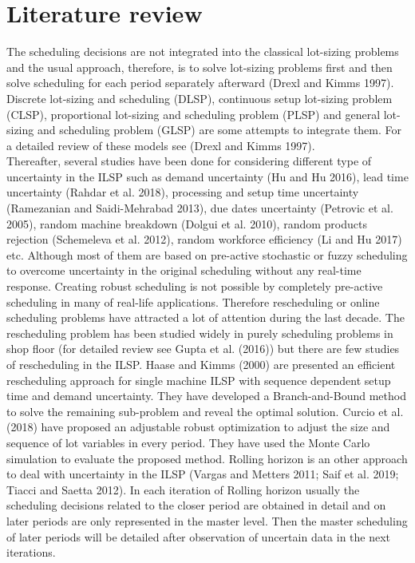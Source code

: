 \documentclass[letterpaper]{article} %
\begin{document}
\section{Literature review}
The scheduling decisions are not integrated into the classical lot-sizing problems and the usual approach, therefore, is to solve lot-sizing problems first and then solve scheduling for each period separately afterward (Drexl and Kimms 1997). Discrete lot-sizing and scheduling (DLSP), continuous setup lot-sizing problem (CLSP), proportional lot-sizing and scheduling problem (PLSP) and general lot-sizing and scheduling problem (GLSP) are some attempts to integrate them. For a detailed review of these models see (Drexl and Kimms 1997).\\
Thereafter, several studies have been done for considering different type of uncertainty in the ILSP such as demand uncertainty (Hu and Hu 2016), lead time uncertainty (Rahdar et al. 2018), processing and setup time uncertainty (Ramezanian and Saidi-Mehrabad 2013), due dates uncertainty (Petrovic et al. 2005), random machine breakdown (Dolgui et al. 2010), random products rejection (Schemeleva et al. 2012), random workforce efficiency (Li and Hu 2017) etc. Although most of them are based on pre-active stochastic or fuzzy scheduling to overcome uncertainty in the original scheduling without any real-time response. Creating robust scheduling  is not possible by completely pre-active scheduling in many of real-life applications. Therefore rescheduling or online scheduling problems have attracted a lot of attention during the last decade. The rescheduling problem has been studied widely in purely scheduling problems in shop floor (for detailed review see Gupta et al. (2016)) but there are few studies of rescheduling in the ILSP. Haase and Kimms (2000) are presented an efficient rescheduling approach for single machine ILSP with sequence dependent setup time and demand uncertainty. They have developed a Branch-and-Bound method to solve the remaining sub-problem and reveal the optimal solution. Curcio et al. (2018) have proposed an adjustable robust optimization to adjust the size and sequence of lot variables in every period. They have used the Monte Carlo simulation to evaluate the proposed method. Rolling horizon is an other approach to deal with uncertainty in the ILSP (Vargas and Metters 2011; Saif et al. 2019; Tiacci and Saetta 2012). In each iteration of Rolling horizon usually the scheduling decisions related to the closer period are obtained in detail and on later periods are only represented in the master level. Then the master scheduling of later periods will be detailed after observation of uncertain data in the next iterations.
\end{document}
